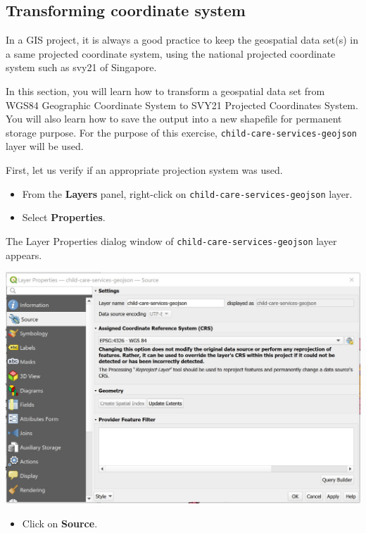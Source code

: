 \documentclass[
  letterpaper,
  DIV=11,
  numbers=noendperiod]{scrreprt}
\providecommand{\tightlist}{%
  \setlength{\itemsep}{0pt}\setlength{\parskip}{0pt}}\usepackage{longtable,booktabs,array}
\begin{document}
\hypertarget{transforming-coordinate-system}{%
\subsection{Transforming coordinate
system}\label{transforming-coordinate-system}}

In a GIS project, it is always a good practice to keep the geospatial
data set(s) in a same projected coordinate system, using the national
projected coordinate system such as svy21 of Singapore.

In this section, you will learn how to transform a geospatial data set
from WGS84 Geographic Coordinate System to SVY21 Projected Coordinates
System. You will also learn how to save the output into a new shapefile
for permanent storage purpose. For the purpose of this exercise,
\texttt{child-care-services-geojson} layer will be used.

First, let us verify if an appropriate projection system was used.

\begin{itemize}
\tightlist
\item
  From the \textbf{Layers} panel, right-click on
  \texttt{child-care-services-geojson} layer.
\item
  Select \textbf{Properties}.
\end{itemize}

The Layer Properties dialog window of
\texttt{child-care-services-geojson} layer appears.

\includegraphics{./img02/image12.jpg}

\begin{itemize}
\tightlist
\item
  Click on \textbf{Source}.
\end{itemize}
\end{document}
